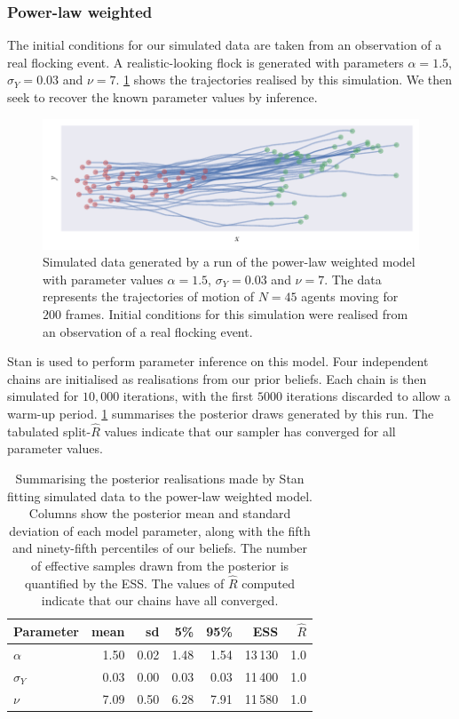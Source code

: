 \subsubsection{Power-law weighted}

The initial conditions for our simulated data are taken from an observation of
a real flocking event. A realistic-looking flock is generated with parameters
$\alpha=1.5$, $\sigma_Y=0.03$ and $\nu=7$. \cref{fig:power_sim} shows the
trajectories realised by this simulation. We then seek to recover the known
parameter values by inference.
\begin{figure}[tbp]
  \includegraphics{power_sim.pdf}
  \caption{Simulated data generated by a run of the power-law weighted model
    with parameter values $\alpha=1.5$, $\sigma_Y=0.03$ and $\nu=7$. The data
    represents the trajectories of motion of $N=45$ agents moving for $200$
    frames. Initial conditions for this simulation were realised from an
    observation of a real flocking event.}
  \label{fig:power_sim}
\end{figure}

Stan is used to perform parameter inference on this model. Four independent
chains are initialised as realisations from our prior beliefs. Each chain is
then simulated for $10,000$ iterations, with the first $5000$ iterations
discarded to allow a warm-up period. \cref{tab:power_summary} summarises the
posterior draws generated by this run. The tabulated split-$\widehat{R}$ values
indicate that our sampler has converged for all
parameter values.

\begin{table}[tbp]
  \begin{tabular}{@{}lrrrrrr@{}}
    \toprule
    Parameter    & mean & sd   & 5\%  & 95\% & ESS     & $\widehat{R}$ \\
    \midrule
    $\alpha$     & 1.50 & 0.02 & 1.48 & 1.54 & 13\,130 & 1.0           \\
    $\sigma_{Y}$ & 0.03 & 0.00 & 0.03 & 0.03 & 11\,400 & 1.0           \\
    $\nu$        & 7.09 & 0.50 & 6.28 & 7.91 & 11\,580 & 1.0           \\
    \bottomrule
  \end{tabular}
  \caption{Summarising the posterior realisations made by Stan fitting
    simulated data to the power-law weighted model. Columns show the
    posterior mean and standard deviation of each model parameter, along with
    the fifth and ninety-fifth percentiles of our beliefs. The number of
    effective samples drawn from the posterior is quantified by the ESS. The
    values of $\widehat{R}$ computed indicate that our chains have all
    converged.}
  \label{tab:power_summary}
\end{table}

